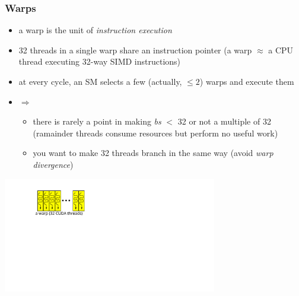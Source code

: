 \documentclass[12pt,dvipdfmx]{beamer}
\newcommand{\ao}[1]{{\color{blue}#1}}
\begin{document}
\begin{frame}
\begin{center}
  \end{center}
\end{frame}

\begin{frame}
  \frametitle{Warps}
  \begin{itemize}
  \item a warp is the unit of \ao{\it instruction execution}
  \item 32 threads in a single warp share an instruction pointer
    (a warp $\approx$ a CPU thread executing 32-way SIMD instructions)
  \item at every cycle, an SM selects a few (actually, $\leq 2$) warps and execute them
  \item $\Rightarrow$
    \begin{itemize}
    \item there is rarely a point in making {\em bs} $<$ 32
      or not a multiple of 32
      (ramainder threads consume resources but perform no useful work)
    \item you want to make 32 threads branch in the same way
      (avoid {\em warp divergence})
    \end{itemize}
  \end{itemize}

  \begin{center}
    \includegraphics[width=0.7\textwidth]{out/pdf/svg/warp_block_sm_2.pdf}
  \end{center}
\end{frame}
\end{document}
